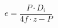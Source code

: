 \documentclass[12pt]{article}
\begin{document}
\begin{displaymath}
e = \frac {P \cdot D_i} {4f \cdot z - P}
\end{displaymath}
\end{document}
